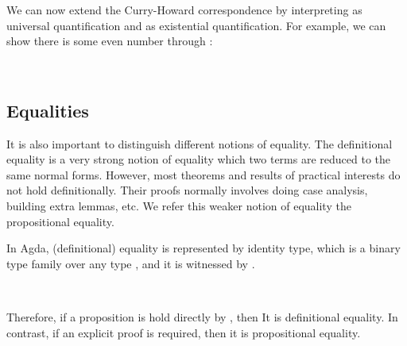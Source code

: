 We can now extend the Curry-Howard correspondence by interpreting  as universal quantification and  as existential quantification. For example, we can show there is some even number through :

\begin{code}%
\>[0]\AgdaSpace{}%
\AgdaSymbol{:}\AgdaSpace{}%
\AgdaSpace{}%
\AgdaSpace{}%
\<%
\\
\>[0]\AgdaSpace{}%
\AgdaSymbol{=}\AgdaSpace{}%
\AgdaSpace{}%
\AgdaOperator{\AgdaInductiveConstructor{,}}\AgdaSpace{}%
\<%
\end{code}

\subsection*{Equalities}

It is also important to distinguish different notions of equality. The definitional equality is a very strong notion of equality which two terms are reduced to the same normal forms. However, most theorems and results of practical interests do not hold definitionally. Their proofs normally involves doing case analysis, building extra lemmas, etc. We refer this weaker notion of equality the propositional equality.

In Agda, (definitional) equality is represented by identity type, which is a binary type family over any type , and it is witnessed by .

\begin{code}%
\>[0]\AgdaSpace{}%
\AgdaSpace{}%
\AgdaSymbol{\{}\AgdaSpace{}%
\AgdaSymbol{:}\AgdaSpace{}%
\AgdaSymbol{\}}\AgdaSpace{}%
\AgdaSymbol{(}\AgdaSpace{}%
\AgdaSymbol{:}\AgdaSpace{}%
\AgdaSymbol{)}\AgdaSpace{}%
\AgdaSymbol{:}\AgdaSpace{}%
\AgdaSpace{}%
\AgdaSpace{}%
\AgdaSpace{}%
\<%
\\
\>[0][@{}l@{\AgdaIndent{0}}]%
\>[2]\AgdaSpace{}%
\AgdaSymbol{:}\AgdaSpace{}%
\AgdaSpace{}%
\AgdaSpace{}%
\<%
\end{code}

Therefore, if a proposition is hold directly by , then It is definitional equality. In contrast, if an explicit proof is required, then it is propositional equality.

